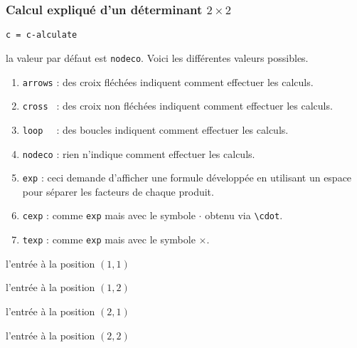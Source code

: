 \documentclass[12pt,a4paper]{article}
\theoremstyle{definition}
\newcommand\env[1]{\texttt{#1}}
\newcommand\macro[1]{\env{\textbackslash{}#1}}
\newcommand\extraspace{
    \vspace{0.25em}
}
\newcommand\mwhyprefix[2]{%
    \texttt{#1 = #1-#2}%
}
\begin{document}
\subsubsection{\texorpdfstring{Calcul expliqué d'un déterminant $2 \times 2$}%
                           {Calcul expliqué d'un déterminant 2x2}} 



 \hfill \mwhyprefix{c}{alculate}

\IDoption{} la valeur par défaut est \verb+nodeco+. Voici les différentes valeurs possibles.
\begin{enumerate}
    \item \verb+arrows+ : des croix fléchées indiquent comment effectuer les calculs.

    \item \verb+cross + : des croix non fléchées indiquent comment effectuer les calculs.

    \item \verb+loop  + : des boucles indiquent comment effectuer les calculs.

    \item \verb+nodeco+ : rien n'indique comment effectuer les calculs.

    \medskip

    \item \verb+exp+ : ceci demande d'afficher une formule développée en utilisant un espace pour séparer les facteurs de chaque produit.

    \item \verb+cexp+ : comme \verb+exp+ mais avec le symbole $\cdot$ obtenu via \macro{cdot}.

    \item \verb+texp+ : comme \verb+exp+ mais avec le symbole $\times$.
\end{enumerate}

 l'entrée à la position $(1, 1)$

 l'entrée à la position $(1, 2)$

\extraspace

 l'entrée à la position $(2, 1)$

 l'entrée à la position $(2, 2)$                   
\end{document}
